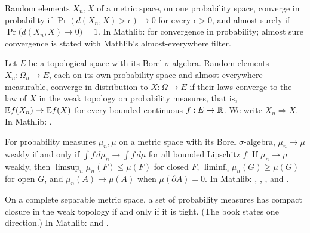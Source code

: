 \begin{definition}
  \label{def:han-2-1}
  \mathlibok
  Random elements $X_n,X$ of a metric space, on one probability space, converge in probability if $\Pr(d(X_n,X)>\epsilon)\to0$ for every $\epsilon>0$, and almost surely if $\Pr\bigl(d(X_n,X)\to0\bigr)=1$.
  In Mathlib:  for convergence in probability; almost sure convergence is stated with Mathlib's almost-everywhere filter.
\end{definition}

\begin{definition}
  \label{def:han-2-2}
  \mathlibok
  Let $E$ be a topological space with its Borel $\sigma$-algebra. Random elements $X_n:\Omega_n\to E$, each on its own probability space and almost-everywhere measurable, converge in distribution to $X:\Omega\to E$ if their laws converge to the law of $X$ in the weak topology on probability measures, that is, $\mathbb{E} f(X_n)\to\mathbb{E} f(X)$ for every bounded continuous $f:E\to\mathbb{R}$. We write $X_n\Rightarrow X$.
  In Mathlib: .
\end{definition}

\begin{proposition}
  \label{prop:han-2-1}
  \mathlibok
  For probability measures $\mu_n,\mu$ on a metric space with its Borel $\sigma$-algebra, $\mu_n\to\mu$ weakly if and only if $\int f\,d\mu_n\to\int f\,d\mu$ for all bounded Lipschitz $f$. If $\mu_n\to\mu$ weakly, then $\limsup_n\mu_n(F)\le\mu(F)$ for closed $F$, $\liminf_n\mu_n(G)\ge\mu(G)$ for open $G$, and $\mu_n(A)\to\mu(A)$ when $\mu(\partial A)=0$.
  In Mathlib: , , ,  and .
\end{proposition}

\begin{theorem}
  \label{thm:han-2-1}
  \mathlibok
  On a complete separable metric space, a set of probability measures has compact closure in the weak topology if and only if it is tight. (The book states one direction.)
  In Mathlib:  and .
\end{theorem}

